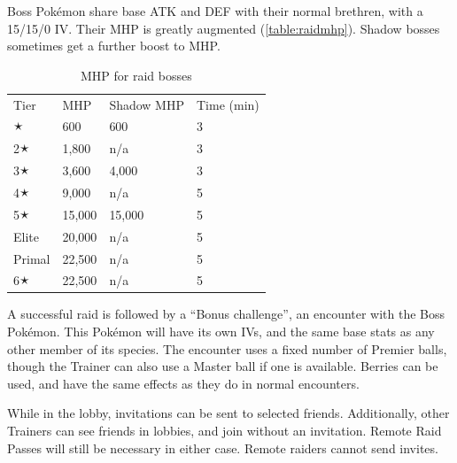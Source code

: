Boss Pokémon share base ATK and DEF with their normal brethren, with a 15/15/0 IV\@.
Their MHP is greatly augmented (\autoref{table:raidmhp}).
Shadow bosses sometimes get a further boost to MHP\@.
\begin{table}
\centering
\begin{tabular}{llll}
  Tier & MHP & Shadow MHP & Time (min)\\
  \Midrule
  1🟉 & 600 & 600 & 3 \\
  2🟉 & 1,800 & n/a & 3\\
  3🟉 & 3,600 & 4,000 & 3\\
  4🟉 & 9,000 & n/a & 5\\
  5🟉 & 15,000 & 15,000 & 5\\
  Elite & 20,000 & n/a & 5\\
  Primal & 22,500 & n/a & 5\\
  6🟉 & 22,500 & n/a & 5\\
\end{tabular}
\caption{MHP for raid bosses}
\label{table:raidmhp}
\end{table}
A successful raid is followed by a ``Bonus challenge'', an encounter with the Boss Pokémon.
This Pokémon will have its own IVs, and the same base stats as any other member of its species.
The encounter uses a fixed number of Premier balls, though the Trainer can also
  use a Master ball if one is available.
Berries can be used, and have the same effects as they do in normal encounters.

While in the lobby, invitations can be sent to selected friends.
Additionally, other Trainers can see friends in lobbies, and join without an invitation.
Remote Raid Passes will still be necessary in either case.
Remote raiders cannot send invites.

